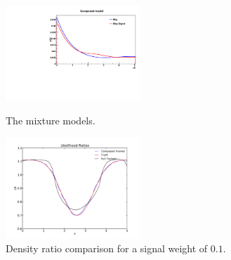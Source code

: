 \documentclass[a4paper]{jpconf}
\begin{document}
\begin{figure}[h]
\begin{minipage}{12pc}
\includegraphics[width=12pc]{full_model.pdf}
\caption{\label{fig:unidist2}The mixture models.}
\end{minipage}\hspace{1pc}
\begin{minipage}{12pc}
\includegraphics[width=12pc]{all_train_mlp_ratio_01.pdf}
\caption{\label{fig:ratios1} Density ratio comparison for a signal weight of $0.1$.} %
\end{minipage}\hspace{1pc}%
\begin{minipage}{12pc}

\end{minipage}
\end{figure}
\end{document}
